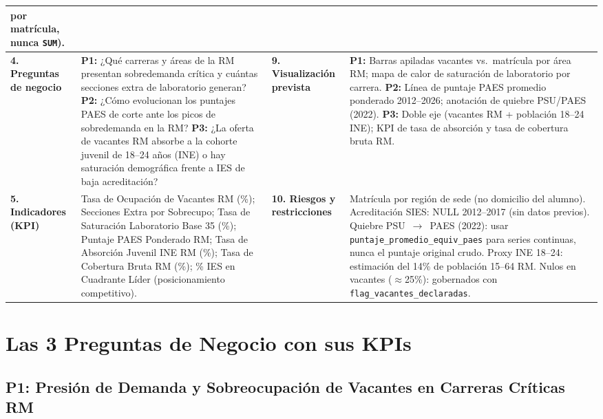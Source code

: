 \documentclass[11pt,a4paper]{article}
\begin{document}
\begin{center}
\begin{tabularx}{\textwidth}{|>{}p{3.0cm}|Y|>{}p{3.0cm}|Y|}
  por matrícula, \textbf{nunca} \texttt{SUM}). \\
\hline
\textbf{\color{primaryblue}4. Preguntas de negocio} &
  \textbf{P1:} ¿Qué carreras y áreas de la RM presentan sobredemanda
  crítica y cuántas secciones extra de laboratorio generan?
  \textbf{P2:} ¿Cómo evolucionan los puntajes PAES de corte ante los picos
  de sobredemanda en la RM?
  \textbf{P3:} ¿La oferta de vacantes RM absorbe a la cohorte juvenil de
  18--24 años (INE) o hay saturación demográfica frente a IES de baja
  acreditación? &
\textbf{\color{primaryblue}9. Visualización prevista} &
  \textbf{P1:} Barras apiladas vacantes vs.\ matrícula por área RM; mapa de
  calor de saturación de laboratorio por carrera.
  \textbf{P2:} Línea de puntaje PAES promedio ponderado 2012--2026; anotación
  de quiebre PSU/PAES (2022).
  \textbf{P3:} Doble eje (vacantes RM + población 18--24 INE); KPI de tasa
  de absorción y tasa de cobertura bruta RM. \\
\hline
\textbf{\color{primaryblue}5. Indicadores (KPI)} &
  Tasa de Ocupación de Vacantes RM (\%);
  Secciones Extra por Sobrecupo;
  Tasa de Saturación Laboratorio Base 35 (\%);
  Puntaje PAES Ponderado RM;
  Tasa de Absorción Juvenil INE RM (\%);
  Tasa de Cobertura Bruta RM (\%);
  \% IES en Cuadrante Líder (posicionamiento competitivo). &
\textbf{\color{primaryblue}10. Riesgos y restricciones} &
  Matrícula por región de sede (no domicilio del alumno).
  Acreditación SIES: NULL 2012--2017 (sin datos previos).
  Quiebre PSU~$\to$~PAES (2022): usar \texttt{puntaje\_promedio\_equiv\_paes}
  para series continuas, nunca el puntaje original crudo.
  Proxy INE 18--24: estimación del 14\% de población 15--64 RM.
  Nulos en vacantes ($\approx$25\%): gobernados con
  \texttt{flag\_vacantes\_declaradas}. \\
\hline
\end{tabularx}
\end{center}

\section{Las 3 Preguntas de Negocio con sus KPIs}
\label{sec:preguntas}

\subsection{P1: Presión de Demanda y Sobreocupación de Vacantes en Carreras Críticas RM}
\end{document}
